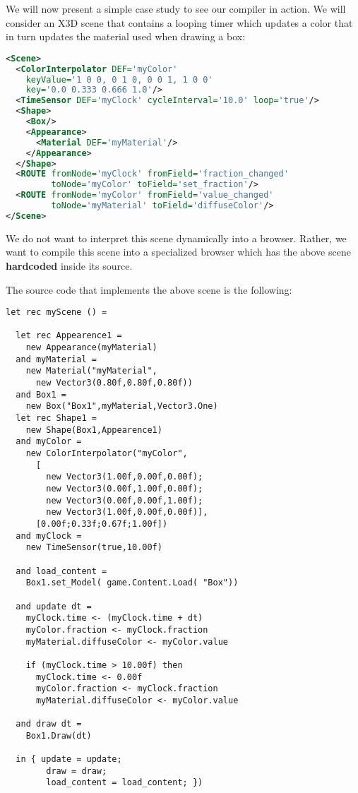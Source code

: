 
We will now present a simple case study to see our compiler in action. We will consider an X3D scene that contains a looping timer which updates a color that in turn updates the material used when drawing a box:

\begin{lstlisting}[language=xml]
<Scene>
  <ColorInterpolator DEF='myColor'
    keyValue='1 0 0, 0 1 0, 0 0 1, 1 0 0'
    key='0.0 0.333 0.666 1.0'/>
  <TimeSensor DEF='myClock' cycleInterval='10.0' loop='true'/>
  <Shape>
    <Box/>
    <Appearance>
      <Material DEF='myMaterial'/>
    </Appearance>
  </Shape>
  <ROUTE fromNode='myClock' fromField='fraction_changed'
         toNode='myColor' toField='set_fraction'/>
  <ROUTE fromNode='myColor' fromField='value_changed'
         toNode='myMaterial' toField='diffuseColor'/>
</Scene>
\end{lstlisting}

We do not want to interpret this scene dynamically into a browser. Rather, we want to compile this scene into a specialized browser which has the above scene \textbf{hardcoded} inside its source.

The source code that implements the above scene is the following:

\begin{lstlisting}
let rec myScene () = 
    
  let rec Appearence1 = 
    new Appearance(myMaterial)
  and myMaterial = 
    new Material("myMaterial",
      new Vector3(0.80f,0.80f,0.80f))
  and Box1 = 
    new Box("Box1",myMaterial,Vector3.One)
  let rec Shape1 = 
    new Shape(Box1,Appearence1)
  and myColor = 
    new ColorInterpolator("myColor",
      [
        new Vector3(1.00f,0.00f,0.00f);
        new Vector3(0.00f,1.00f,0.00f);
        new Vector3(0.00f,0.00f,1.00f);
        new Vector3(1.00f,0.00f,0.00f)],
      [0.00f;0.33f;0.67f;1.00f])
  and myClock = 
    new TimeSensor(true,10.00f)
        
  and load_content = 
    Box1.set_Model( game.Content.Load( "Box"))
    
  and update dt = 
    myClock.time <- (myClock.time + dt)
    myColor.fraction <- myClock.fraction
    myMaterial.diffuseColor <- myColor.value
        
    if (myClock.time > 10.00f) then
      myClock.time <- 0.00f
      myColor.fraction <- myClock.fraction
      myMaterial.diffuseColor <- myColor.value
    
  and draw dt = 
    Box1.Draw(dt)

  in { update = update; 
        draw = draw; 
        load_content = load_content; })
\end{lstlisting}

